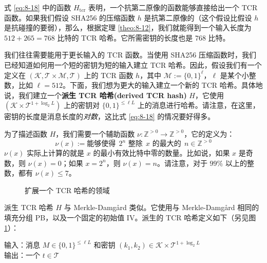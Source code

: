 \begin{snote}[用于长输入的目标抗碰撞性。]
式 \ref{eq:8-18} 中的函数 $H_\mathrm{tcr}$ 表明，一个抗第二原像的函数能够直接给出一个 TCR 函数。如果我们假设 SHA256 的压缩函数 $h$ 是抗第二原像的（这个假设比假设 $h$ 是抗碰撞的要弱），那么，根据定理 \ref{theo:8-12}，我们就能得到一个输入长度为 $512+265=768$ 比特的 TCR 哈希。它所需密钥的长度也是 $768$ 比特。

我们往往需要能用于更长输入的 TCR 函数。当使用 SHA256 压缩函数时，我们已经知道如何用一个短的密钥为短的输入建立 TCR 哈希。因此，假设我们有一个定义在 $(\mathcal{K},\mathcal{T}\times\mathcal{M},\mathcal{T})$ 上的 TCR 函数 $h$，其中 $\mathcal{M}:=\{0,1\}^\ell$，$\ell$ 是某个小整数，比如 $\ell=512$。下面，我们想为更大的输入建立一个新的 TCR 哈希。具体地说，我们建立一个\textbf{派生 TCR 哈希(derived TCR hash)} $H$，它使用 $(\mathcal{K}\times\mathcal{T}^{1+\log_2L})$ 上的密钥对 $\{0,1\}^{\leq\ell L}$ 上的消息进行哈希。请注意，在这里，密钥的长度是消息长度的\emph{对数}，这比式 \ref{eq:8-18} 的情况要好得多。

为了描述函数 $H$，我们需要一个辅助函数 $\nu:\mathbb{Z}^{>0}\to\mathbb{Z}^{>0}$，它的定义为：
\[
\nu(x):=\text{能够使得}\;\, 2^n \text{ 整除}\;\, x \text{ 的最大的}\;\, n\in\mathbb{Z}^{>0}
\]
$\nu(x)$ 实际上计算的就是 $x$ 的最小有效比特中零的数量。比如说，如果 $x$ 是奇数，则 $\nu(x)=0$；如果 $x=2^n$，则 $\nu(x)=n$。请注意，对于 $99$\% 以上的整数，都有 $\nu(x)\leq 7$。

\begin{figure}
	\centering
	
	\caption{扩展一个 TCR 哈希的领域}
	\label{fig:8-15}
\end{figure}

派生 TCR 哈希 $H$ 与 Merkle-Damg{\aa}rd 类似。它使用与 Merkle-Damg{\aa}rd 相同的填充分组 $\mathrm{PB}$，以及一个固定的初始值 $\mathrm{IV}$。派生的 TCR 哈希定义如下（另见图 \ref{fig:8-15}）：

\vspace{5pt}

\hspace*{5pt} 输入：消息 $M\in\{0,1\}^{\leq\ell L}$ 和密钥 $(k_1,k_2)\in\mathcal{K}\times\mathcal{T}^{1+\log_2L}$\\
\hspace*{26pt} 输出：一个 $t\in\mathcal{T}$

\vspace{5pt}


\end{snote}
